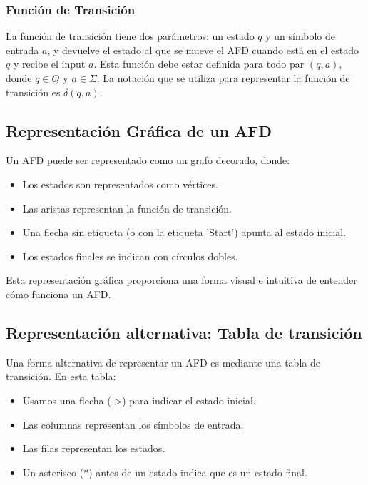 \documentclass[11pt]{article}
\begin{document}
    \subsubsection{Función de Transición}

    La función de transición tiene dos parámetros: un estado $q$ y un símbolo de entrada $a$, y devuelve el estado al que se mueve el AFD cuando está en el estado $q$ y recibe el input $a$. Esta función debe estar definida para todo par $(q, a)$, donde $q \in Q$ y $a \in \Sigma$. La notación que se utiliza para representar la función de transición es $\delta(q, a)$.

    \subsection{Representación Gráfica de un AFD}

    Un AFD puede ser representado como un grafo decorado, donde:

    \begin{itemize}
        \item Los estados son representados como vértices.
        \item Las aristas representan la función de transición.
        \item Una flecha sin etiqueta (o con la etiqueta 'Start') apunta al estado inicial.
        \item Los estados finales se indican con círculos dobles.
    \end{itemize}

    Esta representación gráfica proporciona una forma visual e intuitiva de entender cómo funciona un AFD.

    \subsection{Representación alternativa: Tabla de transición}

    Una forma alternativa de representar un AFD es mediante una tabla de transición. En esta tabla:

    \begin{itemize}
        \item Usamos una flecha (->) para indicar el estado inicial.
        \item Las columnas representan los símbolos de entrada.
        \item Las filas representan los estados.
        \item Un asterisco (*) antes de un estado indica que es un estado final.
    \end{itemize}
\end{document}
